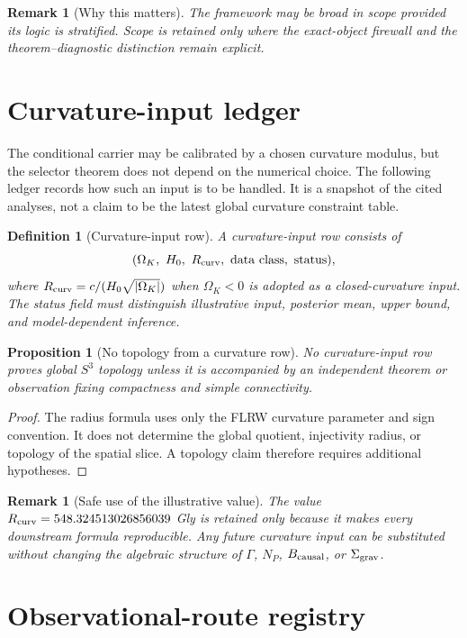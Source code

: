 \documentclass[11pt,a4paper]{article}
\newtheorem{proposition}[theorem]{Proposition}
\newtheorem{definition}[theorem]{Definition}
\newtheorem{remark}[theorem]{Remark}
\begin{document}
\begin{remark}[Why this matters]
The framework may be broad in scope provided its logic is stratified.  Scope is retained only where the exact-object firewall and the theorem--diagnostic distinction remain explicit.
\end{remark}

\section{Curvature-input ledger}

The conditional carrier may be calibrated by a chosen curvature modulus, but the selector theorem does not depend on the numerical choice.  The following ledger records how such an input is to be handled.  It is a snapshot of the cited analyses, not a claim to be the latest global curvature constraint table.

\begin{definition}[Curvature-input row]
A curvature-input row consists of
\[
(\Omega_K,\ H_0,\ R_{\rm curv},\ {\rm data\ class},\ {\rm status}),
\]
where $R_{\rm curv}=c/(H_0\sqrt{|\Omega_K|})$ when $\Omega_K<0$ is adopted as a closed-curvature input.  The status field must distinguish illustrative input, posterior mean, upper bound, and model-dependent inference.
\end{definition}

\begin{proposition}[No topology from a curvature row]
No curvature-input row proves global $S^3$ topology unless it is accompanied by an independent theorem or observation fixing compactness and simple connectivity.
\end{proposition}
\begin{proof}
The radius formula uses only the FLRW curvature parameter and sign convention.  It does not determine the global quotient, injectivity radius, or topology of the spatial slice.  A topology claim therefore requires additional hypotheses.
\end{proof}

\begin{remark}[Safe use of the illustrative value]
The value $R_{\rm curv}=548.324513026856039$ Gly is retained only because it makes every downstream formula reproducible.  Any future curvature input can be substituted without changing the algebraic structure of $\Gamma$, $N_P$, $B_{\rm causal}$, or $\Sigma_{\rm grav}$.
\end{remark}

\section{Observational-route registry}
\end{document}
